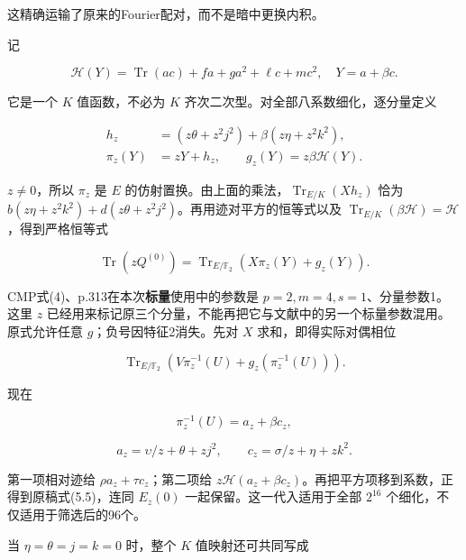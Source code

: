 \documentclass[UTF8,fontset=fandol,zihao=-4,openany,oneside]{ctexbook}
\begin{document}
这精确运输了原来的Fourier配对，而不是暗中更换内积。



记



\[
\mathcal H(Y)=\operatorname{Tr}(ac)+fa+ga^2+\ell c+mc^2,
\quad Y=a+\beta c.
\]



它是一个 \(K\) 值函数，不必为 \(K\) 齐次二次型。对全部八系数细化，逐分量定义



\[
\begin{aligned}
h_z&=(z\theta+z^2j^2)+\beta(z\eta+z^2k^2),\\
\pi_z(Y)&=zY+h_z,
\qquad g_z(Y)=z\beta\mathcal H(Y).
\end{aligned}
\]



\(z\ne0\)，所以 \(\pi_z\) 是 \(E\) 的仿射置换。由上面的乘法，\(\operatorname{Tr}_{E/K}(Xh_z)\) 恰为 \(b(z\eta+z^2k^2)+d(z\theta+z^2j^2)\)。再用迹对平方的恒等式以及 \(\operatorname{Tr}_{E/K}(\beta\mathcal H)=\mathcal H\)，得到严格恒等式



\[
\operatorname{Tr}(zQ^{(0)})
=\operatorname{Tr}_{E/\mathbb F_2}
\left(X\pi_z(Y)+g_z(Y)\right).
\]



CMP式(4)、p.313在本次\textbf{标量}使用中的参数是 \(p=2,m=4,s=1\)、分量参数1。这里 \(z\) 已经用来标记原三个分量，不能再把它与文献中的另一个标量参数混用。原式允许任意 \(g\)；负号因特征2消失。先对 \(X\) 求和，即得实际对偶相位



\[
\operatorname{Tr}_{E/\mathbb F_2}
\left(V\pi_z^{-1}(U)+g_z(\pi_z^{-1}(U))\right).
\]



现在



\[
\pi_z^{-1}(U)=a_z+\beta c_z,
\]



\[
a_z=\upsilon/z+\theta+zj^2,
\qquad c_z=\sigma/z+\eta+zk^2.
\]



第一项相对迹给 \(\rho a_z+\tau c_z\)；第二项给 \(z\mathcal H(a_z+\beta c_z)\)。再把平方项移到系数，正得到原稿式(5.5)，连同 \(E_z(0)\) 一起保留。这一代入适用于全部 \(2^{16}\) 个细化，不仅适用于筛选后的96个。



当 \(\eta=\theta=j=k=0\) 时，整个 \(K\) 值映射还可共同写成
\end{document}
